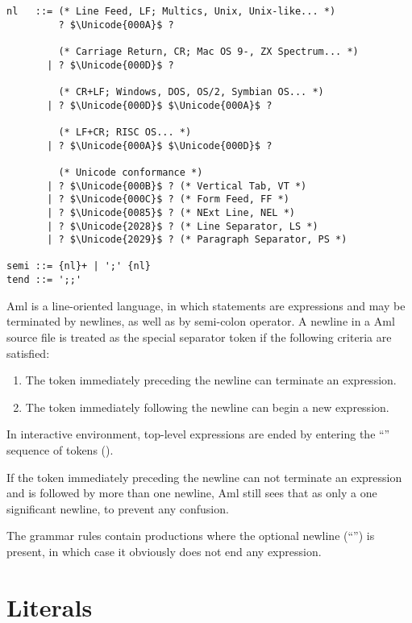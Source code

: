 \syntax\begin{lstlisting}
nl   ::= (* Line Feed, LF; Multics, Unix, Unix-like... *)
         ? $\Unicode{000A}$ ? 
         
         (* Carriage Return, CR; Mac OS 9-, ZX Spectrum... *)
       | ? $\Unicode{000D}$ ? 
       
         (* CR+LF; Windows, DOS, OS/2, Symbian OS... *)
       | ? $\Unicode{000D}$ $\Unicode{000A}$ ?
       
         (* LF+CR; RISC OS... *)
       | ? $\Unicode{000A}$ $\Unicode{000D}$ ?
       
         (* Unicode conformance *)
       | ? $\Unicode{000B}$ ? (* Vertical Tab, VT *)
       | ? $\Unicode{000C}$ ? (* Form Feed, FF *)
       | ? $\Unicode{0085}$ ? (* NExt Line, NEL *)
       | ? $\Unicode{2028}$ ? (* Line Separator, LS *)
       | ? $\Unicode{2029}$ ? (* Paragraph Separator, PS *)
       
semi ::= {nl}+ | ';' {nl}
tend ::= ';;'
\end{lstlisting}

Aml is a line-oriented language, in which statements are expressions and may be terminated by newlines, as well as by semi-colon operator. A newline in a Aml source file is treated as the special separator token \lstinline@nl@ if the following criteria are satisfied:

\begin{enumerate}
  \item The token immediately preceding the newline can terminate an expression.
  \item The token immediately following the newline can begin a new expression. 
\end{enumerate}

In interactive environment, top-level expressions are ended by entering the ``\code{;;}'' sequence of tokens (). 

If the token immediately preceding the newline can not terminate an expression and is followed by more than one newline, Aml still sees that as only a one significant newline, to prevent any confusion.

The grammar rules contain productions where the optional newline (``\code{[nl]}'') is present, in which case it obviously does not end any expression. 






\section{Literals}
\label{sec:literals}

